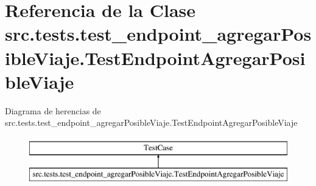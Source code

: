 \hypertarget{classsrc_1_1tests_1_1test__endpoint__agregar_posible_viaje_1_1_test_endpoint_agregar_posible_viaje}{\section{Referencia de la Clase src.\-tests.\-test\-\_\-endpoint\-\_\-agregar\-Posible\-Viaje.\-Test\-Endpoint\-Agregar\-Posible\-Viaje}
\label{classsrc_1_1tests_1_1test__endpoint__agregar_posible_viaje_1_1_test_endpoint_agregar_posible_viaje}
}
Diagrama de herencias de src.\-tests.\-test\-\_\-endpoint\-\_\-agregar\-Posible\-Viaje.\-Test\-Endpoint\-Agregar\-Posible\-Viaje\begin{figure}[H]
\begin{center}
\leavevmode
\includegraphics[height=2.000000cm]{classsrc_1_1tests_1_1test__endpoint__agregar_posible_viaje_1_1_test_endpoint_agregar_posible_viaje}
\end{center}
\end{figure}
